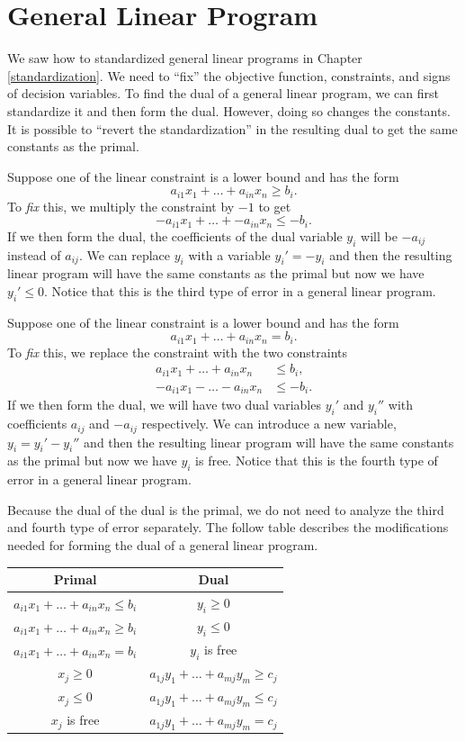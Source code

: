 \documentclass[
]{book}
\theoremstyle{definition}
\theoremstyle{definition}
\theoremstyle{definition}
\theoremstyle{definition}
\theoremstyle{remark}
\begin{document}
\hypertarget{general-linear-program}{%
\section{General Linear Program}\label{general-linear-program}}

We saw how to standardized general linear programs in Chapter \ref{standardization}. We need to ``fix'' the objective function, constraints, and signs of decision variables. To find the dual of a general linear program, we can first standardize it and then form the dual. However, doing so changes the constants. It is possible to ``revert the standardization'' in the resulting dual to get the same constants as the primal.

Suppose one of the linear constraint is a lower bound and has the form \[a_{i1} x_1 + \dots + a_{in} x_n \geq b_i.\]
To \emph{fix} this, we multiply the constraint by \(-1\) to get \[-a_{i1} x_1 + \dots + - a_{in} x_n \leq -b_i.\]
If we then form the dual, the coefficients of the dual variable \(y_i\) will be \(-a_{ij}\) instead of \(a_{ij}\).
We can replace \(y_i\) with a variable \(y_i' = -y_i\) and then the resulting linear program will have the same constants as the primal but now we have \(y_i' \le 0\).
Notice that this is the third type of error in a general linear program.

Suppose one of the linear constraint is a lower bound and has the form \[a_{i1} x_1 + \dots + a_{in} x_n = b_i.\]
To \emph{fix} this, we replace the constraint with the two constraints
\begin{align*}
  a_{i1} x_1 + \dots + a_{in} x_n &\leq b_i, \\
  -a_{i1} x_1 - \dots - a_{in} x_n &\leq -b_i.
\end{align*}
If we then form the dual, we will have two dual variables \(y_i'\) and \(y_i''\) with coefficients \(a_{ij}\) and \(-a_{ij}\) respectively.
We can introduce a new variable, \(y_i = y_i' - y_i''\) and then the resulting linear program will have the same constants as the primal but now we have \(y_i\) is free.
Notice that this is the fourth type of error in a general linear program.

Because the dual of the dual is the primal, we do not need to analyze the third and fourth type of error separately.
The follow table describes the modifications needed for forming the dual of a general linear program.

\begin{longtable}[]{@{}cc@{}}
\toprule()
Primal & Dual \\
\midrule()
\endhead
\(a_{i1} x_1 + \dots + a_{in} x_n \le b_i\) & \(y_i \ge 0\) \\
\(a_{i1} x_1 + \dots + a_{in} x_n \ge b_i\) & \(y_i \le 0\) \\
\(a_{i1} x_1 + \dots + a_{in} x_n = b_i\) & \(y_i\) is free \\
\(x_j \ge 0\) & \(a_{1j}y_1 + \dots + a_{mj} y_m \ge c_j\) \\
\(x_j \le 0\) & \(a_{1j}y_1 + \dots + a_{mj} y_m \le c_j\) \\
\(x_j\) is free & \(a_{1j}y_1 + \dots + a_{mj} y_m = c_j\) \\
\bottomrule()
\end{longtable}
\end{document}
